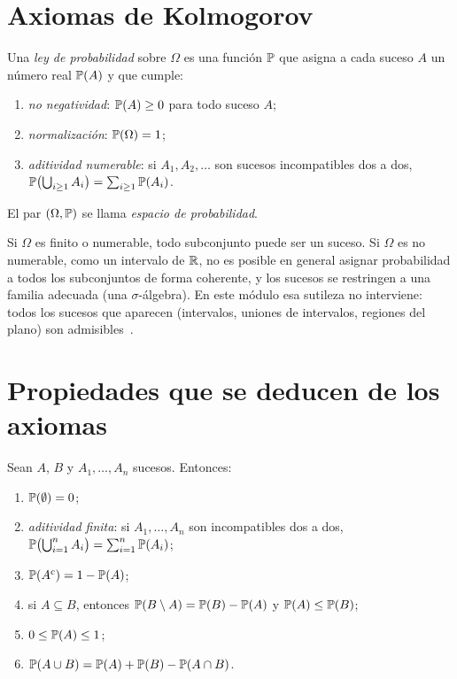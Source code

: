 \section{Axiomas de Kolmogorov}

\begin{definicion}\label{def:t3-axiomas}
Una \emph{ley de probabilidad} sobre $\Omega$ es una función $\mathbb{P}$ que asigna a cada suceso $A$ un número real $\mathbb{P}(A)$ y que cumple:
\begin{enumerate}
  \item \emph{no negatividad}: $\mathbb{P}(A)\ge0$ para todo suceso $A$;
  \item \emph{normalización}: $\mathbb{P}(\Omega)=1$;
  \item \emph{aditividad numerable}: si $A_1,A_2,\dots$ son sucesos incompatibles dos a dos, $\mathbb{P}\bigl(\bigcup_{i\ge1}A_i\bigr)=\sum_{i\ge1}\mathbb{P}(A_i)$.
\end{enumerate}
El par $(\Omega,\mathbb{P})$ se llama \emph{espacio de probabilidad}.
\end{definicion}

\begin{observacion}
Si $\Omega$ es finito o numerable, todo subconjunto puede ser un suceso. Si $\Omega$ es no numerable, como un intervalo de $\mathbb{R}$, no es posible en general asignar probabilidad a todos los subconjuntos de forma coherente, y los sucesos se restringen a una familia adecuada (una $\sigma$-álgebra). En este módulo esa sutileza no interviene: todos los sucesos que aparecen (intervalos, uniones de intervalos, regiones del plano) son admisibles~\cite[§1.6]{bh}.
\end{observacion}

\section{Propiedades que se deducen de los axiomas}

\begin{proposicion}\label{prop:t3-props}
Sean $A$, $B$ y $A_1,\dots,A_n$ sucesos. Entonces:
\begin{enumerate}
  \item $\mathbb{P}(\emptyset)=0$;
  \item \emph{aditividad finita}: si $A_1,\dots,A_n$ son incompatibles dos a dos, $\mathbb{P}\bigl(\bigcup_{i=1}^{n}A_i\bigr)=\sum_{i=1}^{n}\mathbb{P}(A_i)$;
  \item $\mathbb{P}(A^{c})=1-\mathbb{P}(A)$;
  \item si $A\subseteq B$, entonces $\mathbb{P}(B\setminus A)=\mathbb{P}(B)-\mathbb{P}(A)$ y $\mathbb{P}(A)\le\mathbb{P}(B)$;
  \item $0\le\mathbb{P}(A)\le1$;
  \item $\mathbb{P}(A\cup B)=\mathbb{P}(A)+\mathbb{P}(B)-\mathbb{P}(A\cap B)$.
\end{enumerate}
\end{proposicion}

